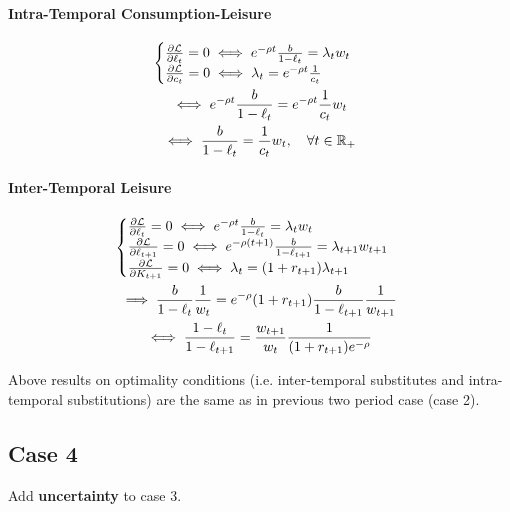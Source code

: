 \documentclass[11pt]{article}
\begin{document}
			\paragraph{Intra-Temporal Consumption-Leisure}
				\begin{gather*}
					\begin{cases}
						\frac{\partial{\mathcal{{L}}}}{\partial{\ell_t}} = 0 \iff e^{-\rho t} \frac{b}{1-\ell_t} = \lambda_t w_t \\
						\frac{\partial{\mathcal{{L}}}}{\partial{c_t}} = 0 \iff \lambda_t = e^{-\rho t}\frac{1}{c_t}
					\end{cases} \\
					\iff e^{-\rho t} \frac{b}{1-\ell_t} = e^{-\rho t}\frac{1}{c_t} w_t \\
					\iff \frac{b}{1-\ell_t} = \frac{1}{c_t} w_t,\quad \forall t \in \mathbb{R}_+
				\end{gather*}
				
			\paragraph{Inter-Temporal Leisure}
				\begin{gather*}
					\begin{cases}
						\frac{\partial{\mathcal{{L}}}}{\partial{\ell_t}} = 0 \iff e^{-\rho t} \frac{b}{1-\ell_t} = \lambda_t w_t \\
						\frac{\partial{\mathcal{{L}}}}{\partial{\ell_{t+1}}} = 0 \iff e^{-\rho (t+1)} \frac{b}{1-\ell_{t+1}} = \lambda_{t+1} w_{t+1} \\
						\frac{\partial{\mathcal{{L}}}}{\partial{K_{t+1}}} = 0 \iff \lambda_t = (1+r_{t+1})\lambda_{t+1}
					\end{cases}\\
					\implies \frac{b}{1-\ell_t} \frac{1}{w_t} = e^{-\rho} (1+r_{t+1}) \frac{b}{1-\ell_{t+1}}\frac{1}{w_{t+1}} \\
					\iff \frac{1-\ell_{t}}{1-\ell_{t+1}} = \frac{w_{t+1}}{w_{t}} \frac{1}{(1+r_{t+1}) e^{-\rho}}
				\end{gather*}
			\begin{remark}
				Above results on optimality conditions (i.e. inter-temporal substitutes and intra-temporal substitutions) are the same as in previous two period case (case 2).
			\end{remark}	
		\subsection{Case 4}
			\begin{assumption}
				Add \textbf{uncertainty} to case 3.
			\end{assumption}
\end{document}
